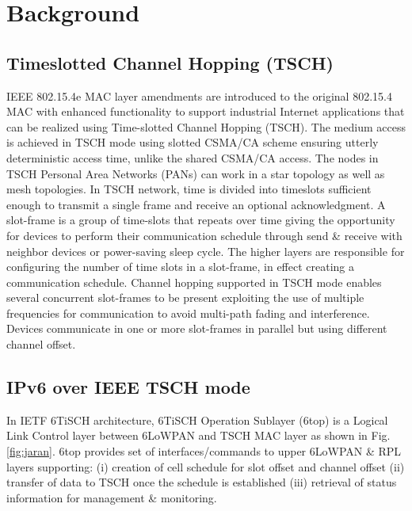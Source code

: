 \section{Background}



\subsection{Timeslotted Channel Hopping (TSCH)}

IEEE 802.15.4e MAC layer amendments \cite{7460875} are introduced to the original 802.15.4 MAC \cite{website} with enhanced functionality to support industrial Internet applications that can be realized using Time-slotted Channel Hopping (TSCH). The medium access is achieved in TSCH mode using slotted CSMA/CA scheme ensuring utterly deterministic access time, unlike the shared CSMA/CA access. The nodes in TSCH Personal Area Networks (PANs) can work in a star topology as well as mesh topologies. In TSCH network, time is divided into timeslots sufficient enough to transmit a single frame and receive an optional acknowledgment. A slot-frame is a group of time-slots that repeats over time giving the opportunity for devices to perform their communication schedule through send \& receive with neighbor devices or power-saving sleep cycle. The higher layers are responsible for configuring the number of time slots in a slot-frame, in effect creating a communication schedule. Channel hopping supported in TSCH mode enables several concurrent slot-frames to be present exploiting the use of multiple frequencies for communication to avoid multi-path fading and interference. Devices communicate in one or more slot-frames in parallel but using different channel offset.

\subsection{IPv6 over IEEE TSCH mode}

In IETF 6TiSCH architecture, 6TiSCH Operation Sublayer (6top) \cite{website2} is a Logical Link Control layer between 6LoWPAN and TSCH MAC layer as shown in Fig. \ref{fig:jaran}. 6top provides set of interfaces/commands to upper 6LoWPAN \& RPL layers supporting: (i) creation of cell schedule for slot offset and channel offset (ii) transfer of data to TSCH once the schedule is established (iii) retrieval of status information for management \& monitoring.

